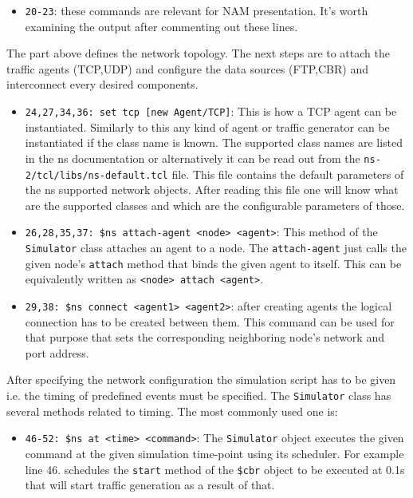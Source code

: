 \documentclass[a4paper]{article}
\begin{document}
\begin{itemize}
    \item \verb!20-23!: these commands are relevant for NAM presentation. It's worth examining the output
          after
          commenting out these lines.

\end{itemize}

The part above defines the network topology. The next steps are to attach the traffic agents (TCP,UDP) and configure
the data sources (FTP,CBR) and interconnect every desired components.

\begin{itemize}%

    \item \verb!24,27,34,36: set tcp [new Agent/TCP]!: This is how a TCP agent can be instantiated. Similarly to this any kind of agent or
          traffic generator can be instantiated if the class name is known. The supported class names are listed in the
          ns
          documentation or alternatively it can be read out from the \verb!ns-2/tcl/libs/ns-default.tcl! file. This file contains
          the default
          parameters of the ns supported network objects. After reading this file one will know what are the supported
          classes
          and which are the configurable parameters of those.

    \item \verb!26,28,35,37: $ns attach-agent <node> <agent>!: This method of the \verb!Simulator! class attaches an agent to a node. The
          \verb!attach-agent! just calls the given node's \verb!attach! method that binds the given agent
          to
          itself. This can be equivalently written as \verb!<node> attach <agent>!.

    \item \verb!29,38: $ns connect <agent1> <agent2>!: after creating agents the logical connection has to be created between them. This
          command can be used for that purpose that sets the corresponding neighboring node's network and port address.

\end{itemize}

After specifying the network configuration the simulation script has to be given i.e. the timing of predefined events
must be specified. The \verb!Simulator! class has several methods related to timing. The most commonly used one
is:

\begin{itemize}

    \item \verb!46-52: $ns at <time> <command>!: The \verb!Simulator! object executes the given command at the given
          simulation
          time-point  using its scheduler. For example line 46. schedules the \verb!start! method of the
          \verb!$cbr! object to be executed at 0.1s that will start traffic generation as a result of that.

\end{itemize}
\end{document}
